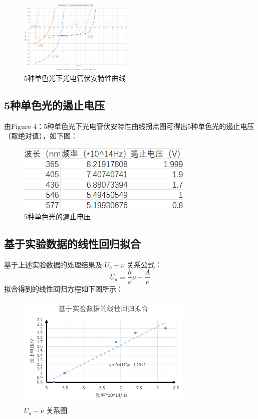 \documentclass[12pt,a4paper]{article}
\begin{document}
\begin{figure}[H]
		\includegraphics[width=0.49\textwidth]{拐点图.png}
		\caption{5种单色光下光电管伏安特性曲线}
		\label{fig:chart1}
	\end{figure}

	\subsection{5种单色光的遏止电压}
	由\quad Figure 4：5种单色光下光电管伏安特性曲线拐点图\quad 可得出5种单色光的遏止电压（取绝对值），如下图：
	\begin{figure}[htbp]
		\centering
		\includegraphics[width=0.75\textwidth]{遏止电压.png}
		\caption{5种单色光的遏止电压}
		\label{fig:chart1}
	\end{figure}

	\subsection{基于实验数据的线性回归拟合}
	基于上述实验数据的处理结果及 $U_{a} - \nu$ 关系公式：
	\begin{equation}
	U_{a} = \frac{h}{e} \nu - \frac{A}{e}
	\end{equation}
	拟合得到的线性回归方程如下图所示：
	
	\begin{figure}[htbp]
		\centering
		\includegraphics[width=0.75\textwidth]{拟合.png}
		\caption{$U_{a} - \nu$ 关系图}
		\label{fig:Ua-nu}
	\end{figure}
\end{document}
